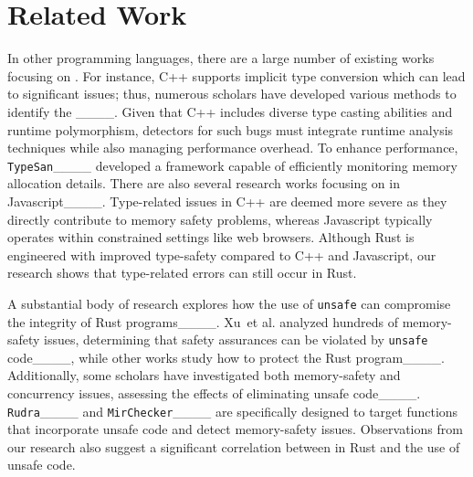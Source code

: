 \section{Related Work}
 In other programming languages, there are a large number of existing works focusing on \bugs. 
For instance, C++ supports implicit type conversion which can lead to significant issues; thus, numerous scholars have developed various methods to identify the \bugs ____. 
Given that C++ includes diverse type casting abilities and runtime polymorphism,
detectors for such bugs must integrate runtime analysis techniques while also managing performance overhead. 
To enhance performance, \texttt{TypeSan}____ developed a framework capable of efficiently monitoring memory allocation details. 
There are also several research works focusing on \bugs in Javascript____. 
Type-related issues in C++ are deemed more severe as they directly contribute to memory safety problems, whereas Javascript typically operates within constrained settings like web browsers. 
Although Rust is engineered with improved type-safety compared to C++ and Javascript, our research shows that type-related errors can still occur in Rust.


\vspace{0.05in}
A substantial body of research explores how the use of \texttt{unsafe} can compromise the integrity of Rust programs____. 
Xu~et al. analyzed hundreds of memory-safety issues, determining that safety assurances can be violated by \texttt{unsafe} code____, while other works study how to protect the Rust program____. 
Additionally, some scholars have investigated both memory-safety and concurrency issues, assessing the effects of eliminating unsafe code____. 
\texttt{Rudra}____ and \texttt{MirChecker}____ are specifically designed to target functions that incorporate unsafe code
and detect memory-safety issues.
%
Observations from our research also suggest a significant correlation between  \bugs in Rust and the use of unsafe code. 
